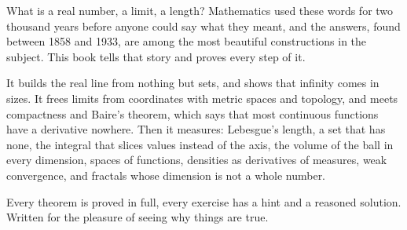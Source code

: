 What is a real number, a limit, a length? Mathematics used these words for two thousand years before anyone could
say what they meant, and the answers, found between 1858 and 1933, are among the most beautiful constructions in
the subject. This book tells that story and proves every step of it.

It builds the real line from nothing but sets, and shows that infinity comes in sizes. It frees limits from
coordinates with metric spaces and topology, and meets compactness and Baire's theorem, which says that most continuous functions have a derivative nowhere. Then it
measures: Lebesgue's length, a set that has none, the integral that slices values instead of the axis, the volume of
the ball in every dimension, spaces of functions, densities as derivatives of measures, weak convergence, and
fractals whose dimension is not a whole number.

Every theorem is proved in full, every exercise has a hint and a reasoned solution. Written for the pleasure of seeing why things are true.

